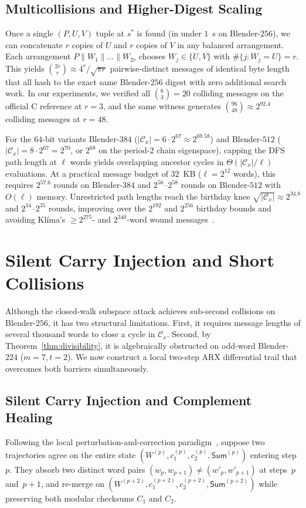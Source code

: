 \documentclass[11pt,a4paper]{article}
\theoremstyle{definition}
\theoremstyle{remark}
\newcommand{\SumAcc}{\mathsf{Sum}}
\begin{document}
\subsection{Multicollisions and Higher-Digest Scaling}
\label{subsec:route1-scaling}
Once a single $(P, U, V)$ tuple at $s^*$ is found (in under $1$~s on Blender-$256$), we can concatenate $r$ copies of $U$ and $r$ copies of $V$ in any balanced arrangement. Each arrangement $P \| W_1 \| \dots \| W_{2r}$ chooses $W_j \in \{U, V\}$ with $\#\{j : W_j = U\} = r$. This yields $\binom{2r}{r} \approx 4^r / \sqrt{\pi r}$ pairwise-distinct messages of identical byte length that all hash to the exact same Blender-$256$ digest with zero additional search work. In our experiments, we verified all $\binom{6}{3} = 20$ colliding messages on the official C reference at $r=3$, and the same witness generates $\binom{96}{48} \approx 2^{92.4}$ colliding messages at $r = 48$.

For the $64$-bit variants Blender-$384$ ($|\mathcal{C}_x| = 6 \cdot 2^{67} \approx 2^{69.58}$) and Blender-$512$ ($|\mathcal{C}_x| = 8 \cdot 2^{67} = 2^{70}$, or $2^{68}$ on the period-$2$ chain eigenspace), capping the DFS path length at $\ell$ words yields overlapping ancestor cycles in $\Theta(|\mathcal{C}_x|/\ell)$ evaluations. At a practical message budget of $32$~KB ($\ell = 2^{12}$ words), this requires $2^{57.6}$ rounds on Blender-$384$ and $2^{56}\text{--}2^{58}$ rounds on Blender-$512$ with $O(\ell)$ memory. Unrestricted path lengths reach the birthday knee $\sqrt{|\mathcal{C}_x|} \approx 2^{34.8}$ and $2^{34}\text{--}2^{35}$ rounds, improving over the $2^{192}$ and $2^{256}$ birthday bounds and avoiding Kl\'{i}ma's $\ge 2^{275}$- and $2^{340}$-word wound messages~\cite{Kli09}.

\section{Silent Carry Injection and Short Collisions}
\label{sec:route2}

Although the closed-walk subspace attack achieves sub-second collisions on Blender-$256$, it has two structural limitations. First, it requires message lengths of several thousand words to close a cycle in $\mathcal{C}_x$. Second, by Theorem~\ref{thm:divisibility}, it is algebraically obstructed on odd-word Blender-$224$ ($m=7, t=2$). We now construct a local two-step ARX differential trail that overcomes both barriers simultaneously.

\subsection{Silent Carry Injection and Complement Healing}
\label{subsec:silent-carry}
Following the local perturbation-and-correction paradigm~\cite{CJ98}, suppose two trajectories agree on the entire state $(W^{(p)}, c_1^{(p)}, c_2^{(p)}, \SumAcc^{(p)})$ entering step~$p$. They absorb two distinct word pairs $(w_p, w_{p+1}) \neq (w'_p, w'_{p+1})$ at steps~$p$ and~$p+1$, and re-merge on $(W^{(p+2)}, c_1^{(p+2)}, c_2^{(p+2)}, \SumAcc^{(p+2)})$ while preserving both modular checksums $C_1$ and $C_2$.
\end{document}
